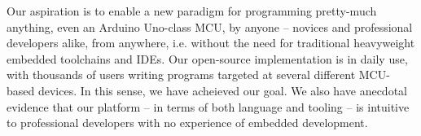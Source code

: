 Our aspiration is to enable a new paradigm for programming pretty-much anything, even an Arduino Uno-class MCU, by anyone -- novices and professional developers alike, from anywhere, i.e. without the need for traditional heavyweight embedded toolchains and IDEs. Our open-source implementation is in daily use, with thousands of users writing programs targeted at several different MCU-based devices. In this sense, we have acheieved our goal. We also have anecdotal evidence that our platform -- in terms of both language and tooling -- is intuitive to professional developers with no experience of embedded development. 


